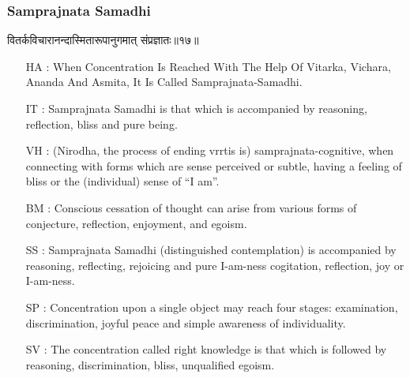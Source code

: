\begin{frame}[fragile]\frametitle{Samprajnata Samadhi}
\begin{sanskrit}
वितर्कविचारानन्दास्मितारूपानुगमात् संप्रज्ञातः॥१७॥
\end{sanskrit}

	\begin{itemize}
	\item [HA]: When Concentration Is Reached With The Help Of Vitarka, Vichara, Ananda And Asmita, It Is Called Samprajnata-Samadhi.
	\item [IT]: Samprajnata Samadhi is that which is accompanied by reasoning, reflection, bliss and pure being.
	\item [VH]: (Nirodha, the process of ending vrrtis is) samprajnata-cognitive, when connecting with forms which are sense perceived or subtle, having a feeling of bliss or the (individual) sense of “I am”.
	\item [BM]: Conscious cessation of thought can arise from various forms of conjecture, reflection, enjoyment, and egoism.
	\item [SS]: Samprajnata Samadhi (distinguished contemplation) is accompanied by reasoning, reflecting, rejoicing and pure I-am-ness cogitation, reflection, joy or I-am-ness.
	\item [SP]: Concentration upon a single object may reach four stages: examination, discrimination, joyful peace and simple awareness of individuality.
	\item [SV]: The concentration called right knowledge is that which is followed by reasoning, discrimination, bliss, unqualified egoism. 
	\end{itemize}
\end{frame}

